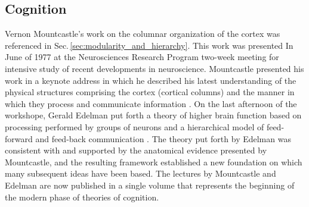 \subsection{\label{sec:cognition}Cognition}
Vernon Mountcastle's work on the columnar organization of the cortex was referenced in Sec.\,\ref{sec:modularity_and_hierarchy}. This work was presented In June of 1977 at the Neurosciences Research Program two-week meeting for intensive study of recent developments in neuroscience. Mountcastle presented his work in a keynote address in which he described his latest understanding of the physical structures comprising the cortex (cortical columns) and the manner in which they process and communicate information \cite{mo1978}. On the last afternoon of the workshope, Gerald Edelman put forth a theory of higher brain function based on processing performed by groups of neurons and a hierarchical model of feed-forward and feed-back communication \cite{ed1978}. The theory put forth by Edelman was consistent with and supported by the anatomical evidence presented by Mountcastle, and the resulting framework established a new foundation on which many subsequent ideas have been based. The lectures by Mountcastle and Edelman are now published in a single volume \cite{edmo1978} that represents the beginning of the modern phase of theories of cognition.

